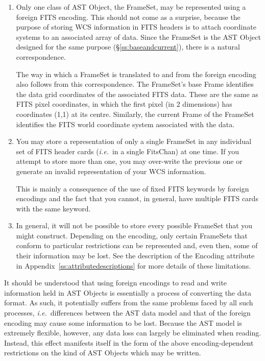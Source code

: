 \documentclass[twoside,11pt]{article}
\newcommand{\appref}[1]{Appendix~\ref{#1}}
\newcommand{\secref}[1]{\S\ref{#1}}
\newcommand{\appref}[1]{\ref{#1}}
\newcommand{\secref}[1]{\ref{#1}}
\begin{document}
\begin{enumerate}
\item Only one class of AST Object, the FrameSet, may be represented
using a foreign FITS encoding. This should not come as a surprise,
because the purpose of storing WCS information in FITS headers is to
attach coordinate systems to an associated array of data. Since the
FrameSet is the AST Object designed for the same purpose
(\secref{ss:baseandcurrent}), there is a natural correspondence.

The way in which a FrameSet is translated to and from the foreign
encoding also follows from this correspondence. The FrameSet's base
Frame identifies the data grid coordinates of the associated FITS
data. These are the same as FITS pixel coordinates, in which the first
pixel (in 2 dimensions) has coordinates (1,1) at its
centre. Similarly, the current Frame of the FrameSet identifies the
FITS world coordinate system associated with the data.

\item You may store a representation of only a single FrameSet in any
individual set of FITS header cards ({\em{i.e.}}\ in a single
FitsChan) at one time. If you attempt to store more than one, you may
over-write the previous one or generate an invalid representation of
your WCS information.

This is mainly a consequence of the use of fixed FITS keywords by
foreign encodings and the fact that you cannot, in general, have
multiple FITS cards with the same keyword.

\item In general, it will not be possible to store every possible
FrameSet that you might construct. Depending on the encoding, only
certain FrameSets that conform to particular restrictions can be
represented and, even then, some of their information may be lost. See
the description of the Encoding attribute in
\appref{ss:attributedescriptions} for more details of these
limitations.
\end{enumerate}

It should be understood that using foreign encodings to read and write
information held in AST Objects is essentially a process of converting
the data format. As such, it potentially suffers from the same
problems faced by all such processes, {\em{i.e.}}\ differences between
the AST data model and that of the foreign encoding may cause some
information to be lost.  Because the AST model is extremely flexible,
however, any data loss can largely be eliminated when reading.
Instead, this effect manifests itself in the form of the above
encoding-dependent restrictions on the kind of AST Objects which may
be written.
\end{document}
